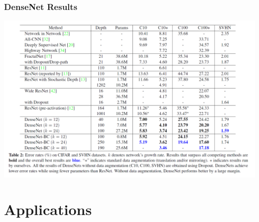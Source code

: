 \begin{frame}
\frametitle{DenseNet Results }

\vspace{-0.4cm}
\begin{center}
	\includegraphics[scale=0.6]{figs/DenseNet_results}
\end{center}
\end{frame}

%
%
%



















\section{Applications}

